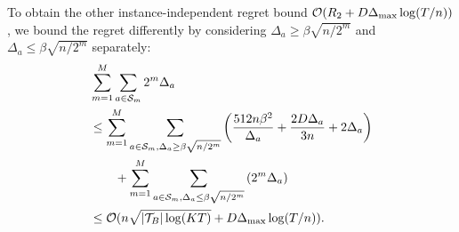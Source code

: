 To obtain the other instance-independent regret bound $\mathcal{O}(R_2+D\Delta_{\max}\log(T/n))$, we bound the regret differently by considering $\Delta_a\geq \beta\sqrt{n/2^m}$ and $\Delta_a\leq \beta\sqrt{n/2^m}$ separately:
\begin{align}
    &\sum_{m=1}^{M}\sum_{a\in{\mathcal{S}}_m}2^m\Delta_a \nonumber \\
    &\leq \sum_{m=1}^{M}\sum_{a\in{\mathcal{S}}_m,\Delta_a\geq\beta\sqrt{n/2^m}}\left(\frac{512n\beta^2}{\Delta_a}+\frac{2D\Delta_a}{3n}+2\Delta_a\right) \nonumber\\
    &\qquad +\sum_{m=1}^{M}\sum_{a\in{\mathcal{S}}_m,\Delta_a\leq\beta\sqrt{n/2^m}}\left(2^m\Delta_a\right) \nonumber \\
    &\leq \mathcal{O}(n\sqrt{|{\mathcal{T}}_B|\log(KT)} + D\Delta_{\max}\log(T/n))\nonumber.
\end{align}

